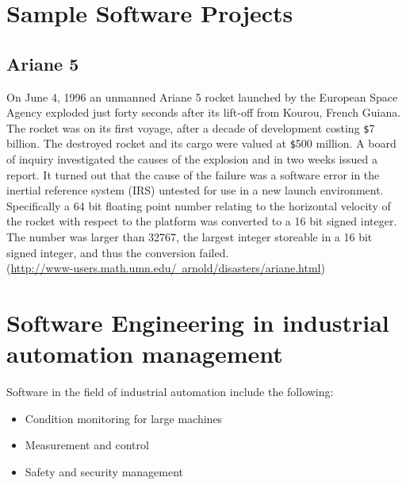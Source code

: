 \section{Sample Software Projects}
\subsection{Ariane 5}
On June 4, 1996 an unmanned Ariane 5 rocket launched by the European Space
Agency exploded just forty seconds after its lift-off from Kourou, French
Guiana. The rocket was on its first voyage, after a decade of development
costing \verb|$|7 billion. The destroyed rocket and its cargo were valued at
\verb|$|500 million. A board of inquiry investigated the causes of the
explosion and in two weeks issued a report. It turned out that the cause
of the failure was a software error in the inertial reference system (IRS)
untested for use in a new launch environment.
Specifically a 64 bit floating point number relating to the horizontal
velocity of the rocket with respect to the platform was converted to a 16 bit
signed integer. The number was larger than 32767, the largest integer
storeable in a 16 bit signed integer, and thus the conversion failed.\\
(\href{http://www-users.math.umn.edu/~arnold/disasters/ariane.html}
{http://www-users.math.umn.edu/~arnold/disasters/ariane.html})

\section{Software Engineering in industrial automation management}
Software in the field of industrial automation include the
following:
\begin{itemize}
\item Condition monitoring for large machines
\item Measurement and control
\item Safety and security management
\end{itemize}


